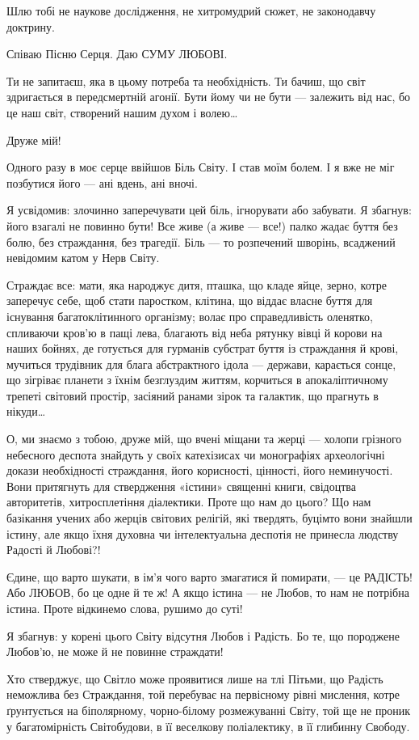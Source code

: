 Шлю тобі не наукове дослідження, не хитромудрий сюжет, не законодавчу доктрину.

Співаю Пісню Серця. Даю СУМУ ЛЮБОВІ.

Ти не запитаєш, яка в цьому потреба та необхідність. Ти бачиш, що світ
здригається в передсмертній агонії. Бути йому чи не бути — залежить від нас, бо
це наш світ, створений нашим духом і волею…

Друже мій!

Одного разу в моє серце ввійшов Біль Світу. І став моїм болем. І я вже не міг
позбутися його — ані вдень, ані вночі.

Я усвідомив: злочинно заперечувати цей біль, ігнорувати або забувати. Я
збагнув: його взагалі не повинно бути! Все живе (а живе — все!) палко жадає
буття без болю, без страждання, без трагедії. Біль — то розпечений шворінь,
всаджений невідомим катом у Нерв Світу.

Страждає все: мати, яка народжує дитя, пташка, що кладе яйце, зерно, котре
заперечує себе, щоб стати паростком, клітина, що віддає власне буття для
існування багатоклітинного організму; волає про справедливість оленятко,
спливаючи кров’ю в пащі лева, благають від неба рятунку вівці й корови на наших
бойнях, де готується для гурманів субстрат буття із страждання й крові,
мучиться трудівник для блага абстрактного ідола — держави, карається сонце, що
зігріває планети з їхнім безглуздим життям, корчиться в апокаліптичному трепеті
світовий простір, засіяний ранами зірок та галактик, що прагнуть в нікуди…

О, ми знаємо з тобою, друже мій, що вчені міщани та жерці — холопи грізного
небесного деспота знайдуть у своїх катехізисах чи монографіях археологічні
докази необхідності страждання, його корисності, цінності, його неминучості.
Вони притягнуть для ствердження «істини» священні книги, свідоцтва авторитетів,
хитросплетіння діалектики. Проте що нам до цього? Що нам базікання учених або
жерців світових релігій, які твердять, буцімто вони знайшли істину, але якщо
їхня духовна чи інтелектуальна деспотія не принесла людству Радості й Любові?!

Єдине, що варто шукати, в ім’я чого варто змагатися й помирати, — це РАДІСТЬ! Або ЛЮБОВ, бо це одне й те ж! А якщо істина — не Любов, то нам не потрібна істина. Проте відкинемо слова, рушимо до суті!

Я збагнув: у корені цього Світу відсутня Любов і Радість. Бо те, що породжене Любов’ю, не може й не повинне страждати!

Хто стверджує, що Світло може проявитися лише на тлі Пітьми, що Радість
неможлива без Страждання, той перебуває на первісному рівні мислення, котре
ґрунтується на біполярному, чорно-білому розмежуванні Світу, той ще не проник у
багатомірність Світобудови, в її веселкову поліалектику, в її глибинну Свободу.

